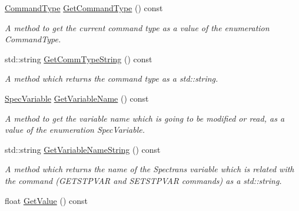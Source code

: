 \begin{DoxyCompactItemize}
\mbox{\label{classCommand_a4e69970f959855553b77b773749dc111}} 
\hyperlink{classCommand_a658ae4be30c6dd9b673e467908acaeb5}{Command\+Type} \hyperlink{classCommand_a4e69970f959855553b77b773749dc111}{Get\+Command\+Type} () const
\begin{DoxyCompactList}\small\item\em A method to get the current command type as a value of the enumeration {\itshape Command\+Type}. \end{DoxyCompactList}\item 
\mbox{\label{classCommand_a4ac214f4079253f6a1fc9137053621ec}} 
std\+::string \hyperlink{classCommand_a4ac214f4079253f6a1fc9137053621ec}{Get\+Comm\+Type\+String} () const
\begin{DoxyCompactList}\small\item\em A method which returns the command type as a {\ttfamily std\+::string}. \end{DoxyCompactList}\item 
\mbox{\label{classCommand_ab3a8e530c1262370a09cf2c4f35b11c5}} 
\hyperlink{Spectran_8h_a0411392c90f0c8f0d8e44a4e94259276}{Spec\+Variable} \hyperlink{classCommand_ab3a8e530c1262370a09cf2c4f35b11c5}{Get\+Variable\+Name} () const
\begin{DoxyCompactList}\small\item\em A method to get the variable name which is going to be modified or read, as a value of the enumeration {\itshape Spec\+Variable}. \end{DoxyCompactList}\item 
\mbox{\label{classCommand_a49e5f8b0ccf24da257adcb78ce337d00}} 
std\+::string \hyperlink{classCommand_a49e5f8b0ccf24da257adcb78ce337d00}{Get\+Variable\+Name\+String} () const
\begin{DoxyCompactList}\small\item\em A method which returns the name of the Spectran\textquotesingle{}s variable which is related with the command ({\itshape G\+E\+T\+S\+T\+P\+V\+AR} and {\itshape S\+E\+T\+S\+T\+P\+V\+AR} commands) as a {\ttfamily std\+::string}. \end{DoxyCompactList}\item 
\mbox{\label{classCommand_a79bfc4354efdeb3639da14cc318bd723}} 
float \hyperlink{classCommand_a79bfc4354efdeb3639da14cc318bd723}{Get\+Value} () const

\end{DoxyCompactItemize}
